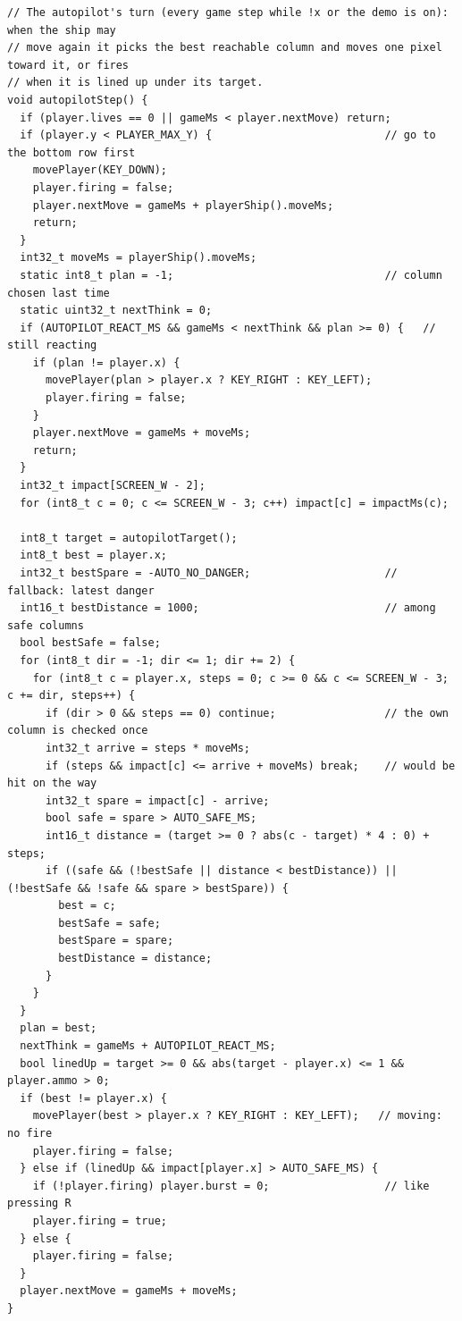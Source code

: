 \documentclass[11pt,a4paper]{article}
\begin{document}
\begin{latin}
\begin{lstlisting}[language=Arduino]
// The autopilot's turn (every game step while !x or the demo is on): when the ship may
// move again it picks the best reachable column and moves one pixel toward it, or fires
// when it is lined up under its target.
void autopilotStep() {
  if (player.lives == 0 || gameMs < player.nextMove) return;
  if (player.y < PLAYER_MAX_Y) {                           // go to the bottom row first
    movePlayer(KEY_DOWN);
    player.firing = false;
    player.nextMove = gameMs + playerShip().moveMs;
    return;
  }
  int32_t moveMs = playerShip().moveMs;
  static int8_t plan = -1;                                 // column chosen last time
  static uint32_t nextThink = 0;
  if (AUTOPILOT_REACT_MS && gameMs < nextThink && plan >= 0) {   // still reacting
    if (plan != player.x) {
      movePlayer(plan > player.x ? KEY_RIGHT : KEY_LEFT);
      player.firing = false;
    }
    player.nextMove = gameMs + moveMs;
    return;
  }
  int32_t impact[SCREEN_W - 2];
  for (int8_t c = 0; c <= SCREEN_W - 3; c++) impact[c] = impactMs(c);

  int8_t target = autopilotTarget();
  int8_t best = player.x;
  int32_t bestSpare = -AUTO_NO_DANGER;                     // fallback: latest danger
  int16_t bestDistance = 1000;                             // among safe columns
  bool bestSafe = false;
  for (int8_t dir = -1; dir <= 1; dir += 2) {
    for (int8_t c = player.x, steps = 0; c >= 0 && c <= SCREEN_W - 3; c += dir, steps++) {
      if (dir > 0 && steps == 0) continue;                 // the own column is checked once
      int32_t arrive = steps * moveMs;
      if (steps && impact[c] <= arrive + moveMs) break;    // would be hit on the way
      int32_t spare = impact[c] - arrive;
      bool safe = spare > AUTO_SAFE_MS;
      int16_t distance = (target >= 0 ? abs(c - target) * 4 : 0) + steps;
      if ((safe && (!bestSafe || distance < bestDistance)) || (!bestSafe && !safe && spare > bestSpare)) {
        best = c;
        bestSafe = safe;
        bestSpare = spare;
        bestDistance = distance;
      }
    }
  }
  plan = best;
  nextThink = gameMs + AUTOPILOT_REACT_MS;
  bool linedUp = target >= 0 && abs(target - player.x) <= 1 && player.ammo > 0;
  if (best != player.x) {
    movePlayer(best > player.x ? KEY_RIGHT : KEY_LEFT);   // moving: no fire
    player.firing = false;
  } else if (linedUp && impact[player.x] > AUTO_SAFE_MS) {
    if (!player.firing) player.burst = 0;                  // like pressing R
    player.firing = true;
  } else {
    player.firing = false;
  }
  player.nextMove = gameMs + moveMs;
}
\end{lstlisting}

\end{latin}
\end{document}
